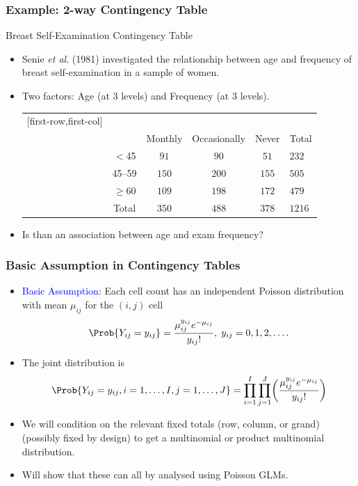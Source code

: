 \documentclass[oneside]{book}\usepackage[]{graphicx}\usepackage[svgnames]{xcolor}
\begin{document}
\subsubsection*{Example: 2-way Contingency Table}
\begin{Example}{Breast Self-Examination Contingency Table}
      \begin{itemize}
            \item Senie \emph{et al}. (1981) investigated the relationship between age and frequency of
                  breast self-examination in a sample of women.
            \item Two factors: Age (at 3 levels) and Frequency (at 3 levels).
                  \begin{center}
                        \begin{NiceTabular}{c|ccc|c}[first-row,first-col]
                              &&\\
                              && Monthly & Occasionally & Never & Total\\
                              \midrule
                               & $<$45 & $ 91 $ & $ 90 $ & $ 51 $ & $ 232 $\\
                              & 45--59 & $ 150 $ & $ 200 $ & $ 155 $ & $ 505 $\\
                              & $ \ge $60 & $ 109 $ & $ 198 $ & $ 172 $ & $ 479 $\\
                              \midrule
                              & Total & $ 350 $ & $ 488 $ & $ 378 $ & $ 1216 $
                        \end{NiceTabular}
                  \end{center}
            \item Is than an association between age and exam frequency?
      \end{itemize}
\end{Example}
\subsubsection*{Basic Assumption in Contingency Tables}
\begin{itemize}
      \item \textcolor{Blue}{Basic Assumption}: Each cell count has an independent Poisson distribution with
            mean $ \mu_{ij} $ for the $ (i,j) $ cell
            \[ \Prob{Y_{ij}=y_{ij}}=\frac{\mu_{ij}^{y_{ij}}e^{-\mu_{ij}}}{y_{ij}!},\;y_{ij}=0,1,2,\ldots. \]
      \item The joint distribution is
            \[ \Prob{Y_{i j}=y_{i j}, i=1, \ldots, I, j=1, \ldots, J}=
                  \prod_{i=1}^{I} \prod_{j=1}^{J}\biggl(\frac{\mu_{i j}^{y_{i j}} e^{-\mu_{i j}}}{y_{i j} !}\biggr) \]
      \item We will condition on the relevant fixed totals (row, column, or grand) (possibly
            fixed by design) to get a multinomial or product multinomial distribution.
      \item Will show that these can all by analysed using Poisson GLMs.
\end{itemize}
\end{document}
